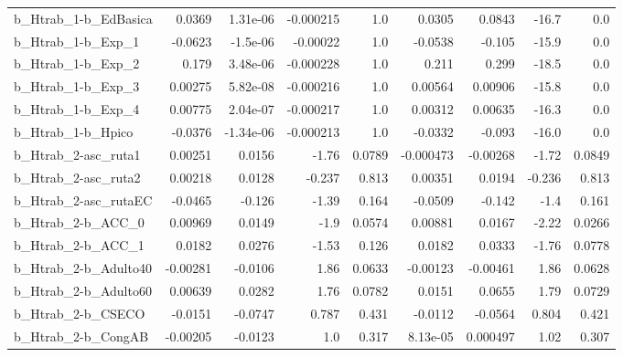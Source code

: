 \begin{tabular}{lrrrrrrrr}
b\_Htrab\_1-b\_EdBasica       &      0.0369 &     1.31e-06 & -0.000215 &      1.0 &     0.0305 &      0.0843 &        -16.7 &           0.0 \\
b\_Htrab\_1-b\_Exp\_1          &     -0.0623 &     -1.5e-06 &  -0.00022 &      1.0 &    -0.0538 &      -0.105 &        -15.9 &           0.0 \\
b\_Htrab\_1-b\_Exp\_2          &       0.179 &     3.48e-06 & -0.000228 &      1.0 &      0.211 &       0.299 &        -18.5 &           0.0 \\
b\_Htrab\_1-b\_Exp\_3          &     0.00275 &     5.82e-08 & -0.000216 &      1.0 &    0.00564 &     0.00906 &        -15.8 &           0.0 \\
b\_Htrab\_1-b\_Exp\_4          &     0.00775 &     2.04e-07 & -0.000217 &      1.0 &    0.00312 &     0.00635 &        -16.3 &           0.0 \\
b\_Htrab\_1-b\_Hpico          &     -0.0376 &    -1.34e-06 & -0.000213 &      1.0 &    -0.0332 &      -0.093 &        -16.0 &           0.0 \\
b\_Htrab\_2-asc\_ruta1        &     0.00251 &       0.0156 &     -1.76 &   0.0789 &  -0.000473 &    -0.00268 &        -1.72 &        0.0849 \\
b\_Htrab\_2-asc\_ruta2        &     0.00218 &       0.0128 &    -0.237 &    0.813 &    0.00351 &      0.0194 &       -0.236 &         0.813 \\
b\_Htrab\_2-asc\_rutaEC       &     -0.0465 &       -0.126 &     -1.39 &    0.164 &    -0.0509 &      -0.142 &         -1.4 &         0.161 \\
b\_Htrab\_2-b\_ACC\_0          &     0.00969 &       0.0149 &      -1.9 &   0.0574 &    0.00881 &      0.0167 &        -2.22 &        0.0266 \\
b\_Htrab\_2-b\_ACC\_1          &      0.0182 &       0.0276 &     -1.53 &    0.126 &     0.0182 &      0.0333 &        -1.76 &        0.0778 \\
b\_Htrab\_2-b\_Adulto40       &    -0.00281 &      -0.0106 &      1.86 &   0.0633 &   -0.00123 &    -0.00461 &         1.86 &        0.0628 \\
b\_Htrab\_2-b\_Adulto60       &     0.00639 &       0.0282 &      1.76 &   0.0782 &     0.0151 &      0.0655 &         1.79 &        0.0729 \\
b\_Htrab\_2-b\_CSECO          &     -0.0151 &      -0.0747 &     0.787 &    0.431 &    -0.0112 &     -0.0564 &        0.804 &         0.421 \\
b\_Htrab\_2-b\_CongAB         &    -0.00205 &      -0.0123 &       1.0 &    0.317 &   8.13e-05 &    0.000497 &         1.02 &         0.307 \\

\end{tabular}
